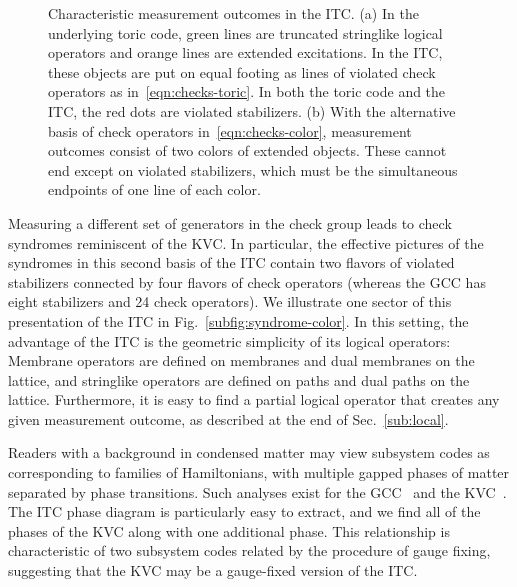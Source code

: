 \begin{figure}[t]
    \centering
    \qquad
    \caption[Characteristic measurement outcomes in the ITC]{Characteristic measurement outcomes in the ITC. (a) In the underlying toric code, green lines are truncated stringlike logical operators and orange lines are extended excitations. In the ITC, these objects are put on equal footing as lines of violated check operators as in~\eqref{eqn:checks-toric}. In both the toric code and the ITC, the red dots are violated stabilizers. (b) With the alternative basis of check operators in~\eqref{eqn:checks-color}, measurement outcomes consist of two colors of extended objects. These cannot end except on violated stabilizers, which must be the simultaneous endpoints of one line of each color.}
    \label{fig:syndrome}
\end{figure}

Measuring a different set of generators in the check group leads to check syndromes reminiscent of the KVC. In particular, the effective pictures of the syndromes in this second basis of the ITC contain two flavors of violated stabilizers connected by four flavors of check operators (whereas the GCC has eight stabilizers and 24 check operators). We illustrate one sector of this presentation of the ITC in Fig.~\ref{subfig:syndrome-color}. In this setting, the advantage of the ITC is the geometric simplicity of its logical operators: Membrane operators are defined on membranes and dual membranes on the lattice, and stringlike operators are defined on paths and dual paths on the lattice.
Furthermore, it is easy to find a partial logical operator that creates any given measurement outcome, as described at the end of Sec.~\ref{sub:local}.

Readers with a background in condensed matter may view subsystem codes as corresponding to families of Hamiltonians, with multiple gapped phases of matter separated by phase transitions. Such analyses exist for the GCC~\cite{Kubica2018Ungauging} and the KVC~\cite{Li2023PhaseDiagram}. The ITC phase diagram is particularly easy to extract, and we find all of the phases of the KVC along with one additional phase. This relationship is characteristic of two subsystem codes related by the procedure of gauge fixing, suggesting that the KVC may be a gauge-fixed version of the ITC.

